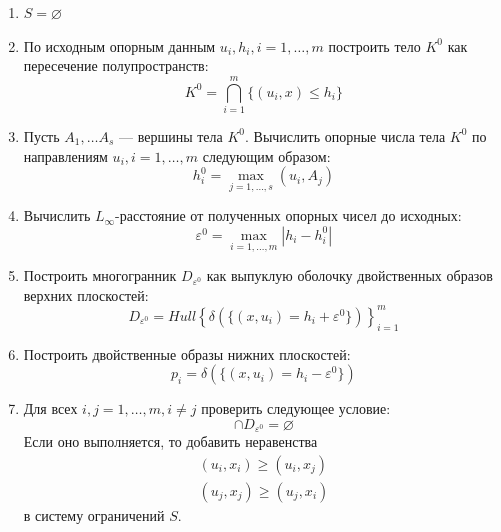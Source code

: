 \documentclass[a4paper, 10pt]{article}
\theoremstyle{definition}
\theoremstyle{plain}
\theoremstyle{plain}
\begin{document}
\begin{enumerate}
 \item $S = \varnothing$
 \item По исходным опорным данным $u_{i}, h_{i}, i = 1, \ldots, m$
 построить тело $K^{0}$ как пересечение полупространств:
 \begin{equation}
 \label{equation:naive-body}
  K^{0} = \bigcap \limits_{i = 1}^{m} \{(u_{i}, x) \leq h_{i}\}
 \end{equation}
 \item Пусть $A_{1}, \ldots A_{s}$ --- вершины тела $K^{0}$. Вычислить опорные
 числа тела $K^{0}$ по направлениям $u_{i}, i = 1, \ldots, m$ следующим образом:
 \begin{equation}
  h^{0}_{i} = \max \limits_{j = 1, \ldots, s} (u_{i}, A_{j})
 \end{equation}
 \item Вычислить $L_{\infty}$-расстояние от полученных опорных чисел до
 исходных:
 \begin{equation}
  \varepsilon^{0} = \max \limits_{i = 1, \ldots, m} |h_{i} - h^{0}_{i}|
 \end{equation}
 \item Построить многогранник $D_{\varepsilon^{0}}$ как выпуклую оболочку
 двойственных образов верхних плоскостей:
 \begin{equation}
  D_{\varepsilon^{0}} =
  Hull \left\{
  \delta(\{(x, u_{i}) = h_{i} + \varepsilon^{0}\})
  \right\}_{i = 1}^{m}
 \end{equation}
 \item Построить двойственные образы нижних плоскостей:
 \begin{equation}
  p_{i} = \delta(\{(x, u_{i}) = h_{i} - \varepsilon^{0}\})
 \end{equation}
 \item Для всех $i, j = 1, \ldots, m, i \neq j$ проверить следующее условие:
 \begin{equation}
  [p_{i}, p_{j}] \cap D_{\varepsilon^{0}} = \varnothing
 \end{equation}
 Если оно выполняется, то добавить неравенства
 \begin{equation}
 \begin{split}
  (u_{i}, x_{i}) \geq (u_{i}, x_{j}) \\
  (u_{j}, x_{j}) \geq (u_{j}, x_{i})
 \end{split}
 \end{equation}
 в систему ограничений $S$.
\end{enumerate}
\end{document}
